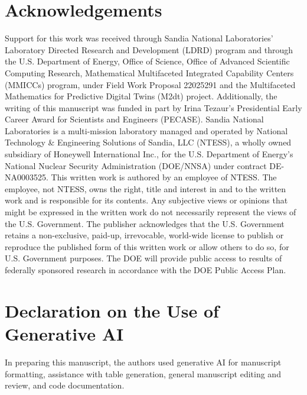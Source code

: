 \documentclass[3p,computermodern,11pt]{elsarticle}
\numberwithin{equation}{section}
\begin{document}
\section{Acknowledgements}
Support for this work was received through Sandia National Laboratories’ Laboratory Directed Research
and Development (LDRD) program and through the U.S. Department of Energy, Office of Science,
Office of Advanced Scientific Computing Research, Mathematical Multifaceted Integrated Capability
Centers (MMICCs) program, under Field Work Proposal 22025291 and the Multifaceted Mathematics for
Predictive Digital Twins (M2dt) project. Additionally, the writing of this manuscript was funded in part
by Irina Tezaur’s Presidential Early Career Award for Scientists and Engineers (PECASE).
Sandia National Laboratories is a multi-mission laboratory managed and
operated by National Technology \& Engineering Solutions of Sandia, LLC
(NTESS), a wholly owned subsidiary of Honeywell International Inc.,
for the U.S. Department of Energy's National Nuclear Security
Administration (DOE/NNSA) under contract DE-NA0003525. This written
work is authored by an employee of NTESS. The employee, not NTESS,
owns the right, title and interest in and to the written work and is
responsible for its contents. Any subjective views or opinions that
might be expressed in the written work do not necessarily represent
the views of the U.S. Government. The publisher acknowledges that the
U.S. Government retains a non-exclusive, paid-up, irrevocable,
world-wide license to publish or reproduce the published form of this
written work or allow others to do so, for U.S. Government
purposes. The DOE will provide public access to results of federally
sponsored research in accordance with the DOE Public Access Plan.

\section{Declaration on the Use of Generative AI}
In preparing this manuscript, the authors used generative AI for manuscript formatting, assistance with table generation, general manuscript editing and review, and code documentation.


\end{document}
